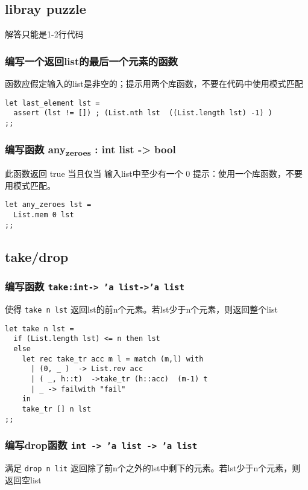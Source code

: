 \documentclass[11pt]{article}
\begin{document}
\subsection{libray puzzle}
\label{sec:orgbbfc069}
解答只能是1-2行代码 

\subsubsection{编写一个返回list的最后一个元素的函数}
\label{sec:orgc18fed6}
函数应假定输入的list是非空的；提示用两个库函数，不要在代码中使用模式匹配

\begin{verbatim}
let last_element lst =
  assert (lst != []) ; (List.nth lst  ((List.length lst) -1) )
;;
\end{verbatim}

\subsubsection{编写函数 any\textsubscript{zeroes} : int list -> bool}
\label{sec:org45df730}
此函数返回 true 当且仅当 输入list中至少有一个 0
提示：使用一个库函数，不要用模式匹配。

\begin{verbatim}
let any_zeroes lst =
  List.mem 0 lst
;;
\end{verbatim}

\subsection{take/drop}
\label{sec:org0f5641b}


\subsubsection{编写函数 \texttt{take:int-> 'a list->'a list}}
\label{sec:orgb5960e7}

使得 \texttt{take n lst} 返回lst的前n个元素。若lst少于n个元素，则返回整个list
\begin{verbatim}
let take n lst =
  if (List.length lst) <= n then lst
  else
    let rec take_tr acc m l = match (m,l) with 
      | (0, _ )  -> List.rev acc 
      | ( _, h::t)  ->take_tr (h::acc)  (m-1) t
      | _ -> failwith "fail" 
    in
    take_tr [] n lst
;;
\end{verbatim}

\subsubsection{编写drop函数 \texttt{int -> 'a list -> 'a list}}
\label{sec:org07c38f0}
满足 \texttt{drop n lit} 返回除了前n个之外的lst中剩下的元素。若lst少于n个元素，则返回空list
\end{document}
